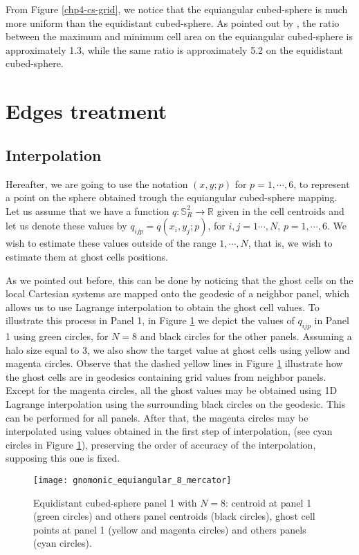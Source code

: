 From Figure \ref{chp4-cs-grid}, we notice that the equiangular cubed-sphere is much more uniform
than the equidistant cubed-sphere. As pointed out by \citet{rancic:1996}, the ratio
between the maximum and minimum cell area on the equiangular cubed-sphere is approximately 1.3,
while the same ratio is approximately 5.2 on the equidistant cubed-sphere. 

\section{Edges treatment}
\label{cs-halodata}
\subsection{Interpolation}
Hereafter, we are going to use the notation $(x,y;p)$ for $p=1,\cdots, 6$, to represent a
point on the sphere obtained trough the equiangular cubed-sphere mapping.
Let us assume that we have a function $q: \mathbb{S}^2_R \to \mathbb{R}$
given in the cell centroids and let us denote these values by $q_{ijp} = q(x_i,y_j;p)$,
for $i,j=1\cdots, N$, $p=1,\cdots, 6$. We wish to estimate these values outside of the range
$1, \cdots, N$, that is, we wish to estimate them at ghost cells positions.

As we pointed out before, this can be done by noticing that the ghost cells on the local
Cartesian systems are mapped onto the geodesic of a neighbor panel, which allows us to use Lagrange interpolation 
to obtain the ghost cell values.
To illustrate this process in Panel 1, in Figure \ref{chp4-cs-halodata} we depict the values of $q_{ijp}$ in Panel 1 using green circles, for $N=8$ 
and black circles for the other panels. Assuming a halo size equal to 3, we also show the target value at ghost cells 
using yellow and magenta circles. Observe that the dashed yellow lines in Figure \ref{chp4-cs-halodata} illustrate
how the ghost cells are in geodesics containing grid values from neighbor panels. Except for the magenta circles,
all the ghost values may be obtained using 1D Lagrange interpolation using the surrounding black circles on the geodesic.
This can be performed for all panels. After that, the magenta circles may be interpolated using values obtained in the first step of interpolation,
(see cyan circles in Figure \ref{chp4-cs-halodata}), preserving the order of accuracy of the interpolation, supposing this one is fixed. 
\begin{figure}[!htb]
	\centering
	\texttt{[image: gnomonic\_equiangular\_8\_mercator]}
	\caption{Equidistant cubed-sphere panel 1 with $N=8$: 
	centroid at panel 1 (green circles) and others panel centroids (black circles), 
	ghost cell points at panel 1 (yellow and magenta circles) and others panels (cyan circles).}
	\label{chp4-cs-halodata}
\end{figure}

